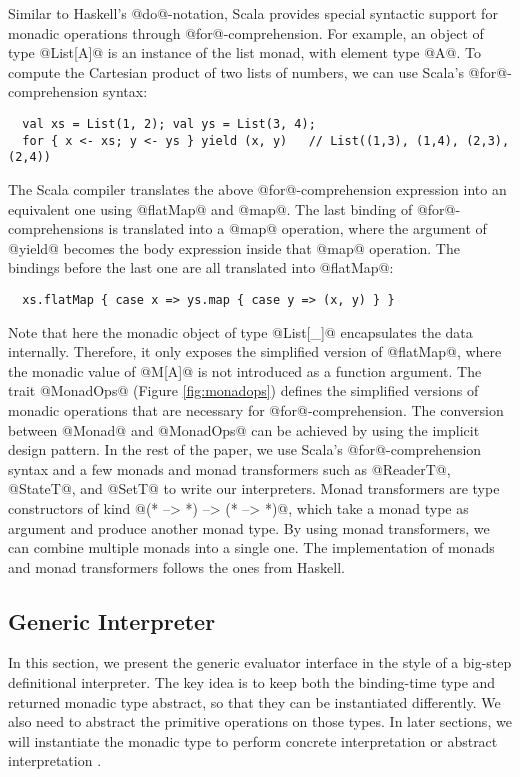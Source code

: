 Similar to Haskell's @do@-notation, Scala provides special syntactic support
for monadic operations through @for@-comprehension.  For example, an object of
type @List[A]@ is an instance of the list monad, with element type @A@.
To compute the Cartesian product of two lists of numbers, we can use Scala's
@for@-comprehension syntax:
\begin{lstlisting}
  val xs = List(1, 2); val ys = List(3, 4); 
  for { x <- xs; y <- ys } yield (x, y)   // List((1,3), (1,4), (2,3), (2,4))
\end{lstlisting}

The Scala compiler translates the above @for@-comprehension expression into
an equivalent one using @flatMap@ and @map@. The last binding
of @for@-comprehensions is translated into a @map@ operation, where the argument of
@yield@ becomes the body expression inside that @map@ operation. The
bindings before the last one are all translated into @flatMap@:
\begin{lstlisting}
  xs.flatMap { case x => ys.map { case y => (x, y) } }
\end{lstlisting}

Note that here the monadic object of type @List[_]@ encapsulates the data internally.
Therefore, it only exposes the simplified version of @flatMap@, where the monadic
value of @M[A]@ is not introduced as a function argument. The trait @MonadOps@ (Figure
\ref{fig:monadops}) defines the simplified versions of monadic operations that
are necessary for @for@-comprehension. The conversion between @Monad@ and
@MonadOps@ can be achieved by using the implicit design pattern.
In the rest of the paper, we use Scala's @for@-comprehension syntax and a few
monads and monad transformers such as @ReaderT@, @StateT@, and @SetT@ to
write our interpreters.
Monad transformers are type constructors of kind @(* --> *) --> (* --> *)@, which
take a monad type as argument and produce another monad type. By using monad
transformers, we can combine multiple monads into a single one.  The
implementation of monads and monad transformers follows the ones from Haskell.

\subsection{Generic Interpreter} \label{generic_if}

In this section, we present the generic evaluator interface in the style of a big-step
definitional interpreter. The key idea is to keep both the binding-time type and
returned monadic type abstract, so that they can be instantiated
differently. We also need to abstract the primitive operations on those types.
In later sections, we will instantiate the monadic type to perform concrete
interpretation \cite{DBLP:conf/popl/LiangHJ95} or abstract interpretation
\cite{Sergey:2013:MAI:2491956.2491979, DBLP:journals/pacmpl/DaraisLNH17}.

